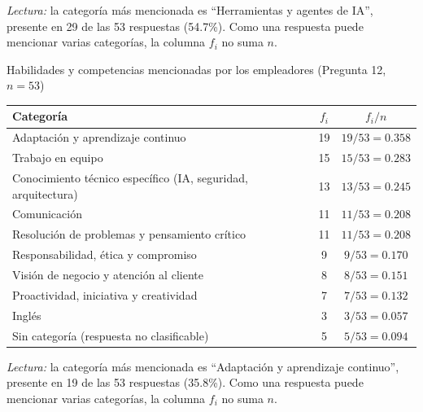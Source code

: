 \textit{Lectura:} la categoría más mencionada es ``Herramientas y agentes de IA'', presente en 29 de las 53 respuestas (54.7\%). Como una respuesta puede mencionar varias categorías, la columna $f_i$ no suma $n$.

\begin{mitabla}{Habilidades y competencias mencionadas por los empleadores (Pregunta 12, $n=53$)}
\begin{tabular}{L{9cm}cc}
\toprule
Categoría & $f_i$ & $f_i/n$ \\
\midrule
Adaptación y aprendizaje continuo & 19 & $19/53 = 0.358$ \\
Trabajo en equipo & 15 & $15/53 = 0.283$ \\
Conocimiento técnico específico (IA, seguridad, arquitectura) & 13 & $13/53 = 0.245$ \\
Comunicación & 11 & $11/53 = 0.208$ \\
Resolución de problemas y pensamiento crítico & 11 & $11/53 = 0.208$ \\
Responsabilidad, ética y compromiso & 9 & $9/53 = 0.170$ \\
Visión de negocio y atención al cliente & 8 & $8/53 = 0.151$ \\
Proactividad, iniciativa y creatividad & 7 & $7/53 = 0.132$ \\
Inglés & 3 & $3/53 = 0.057$ \\
\midrule
Sin categoría (respuesta no clasificable) & 5 & $5/53 = 0.094$ \\
\bottomrule
\end{tabular}
\end{mitabla}

\textit{Lectura:} la categoría más mencionada es ``Adaptación y aprendizaje continuo'', presente en 19 de las 53 respuestas (35.8\%). Como una respuesta puede mencionar varias categorías, la columna $f_i$ no suma $n$.

